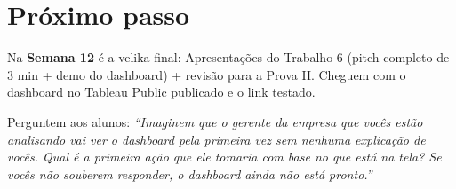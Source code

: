 \section{Próximo passo}

Na \textbf{Semana 12} é a velika final: Apresentações do Trabalho 6
(pitch completo de 3 min + demo do dashboard) + revisão para a Prova II.
Cheguem com o dashboard no Tableau Public publicado e o link testado.

Perguntem aos alunos: \textit{``Imaginem que o gerente da empresa que vocês
estão analisando vai ver o dashboard pela primeira vez sem nenhuma explicação
de vocês. Qual é a primeira ação que ele tomaria com base no que está na tela?
Se vocês não souberem responder, o dashboard ainda não está pronto.''}
